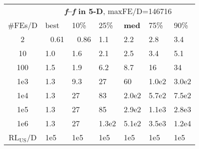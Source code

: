 \begin{tabular}{c|llllll}
 & \multicolumn{6}{|c}{\textbf{\textit{f}\raisebox{-0.35ex}{1}--\textit{f}\raisebox{-0.35ex}{24} in 5-D}, maxFE/D=146716}\\
\#FEs/D & best & 10\% & 25\% & \textbf{med} & 75\% & 90\%\\
2 & ~\,0.61 & ~\,0.86 & \hspace*{1ex}1.1 & \hspace*{1ex}2.2 & \hspace*{1ex}2.8 & \hspace*{1ex}3.4\\
10 & \hspace*{1ex}1.0 & \hspace*{1ex}1.6 & \hspace*{1ex}2.1 & \hspace*{1ex}2.5 & \hspace*{1ex}3.4 & \hspace*{1ex}5.1\\
100 & \hspace*{1ex}1.5 & \hspace*{1ex}1.9 & \hspace*{1ex}6.2 & \hspace*{1ex}8.7 & 16 & 34\\
1e3 & \hspace*{1ex}1.3 & \hspace*{1ex}9.3 & 27 & 60 & 1.0e2 & 3.0e2\\
1e4 & \hspace*{1ex}1.3 & 27 & 83 & 2.0e2 & 5.7e2 & 7.5e2\\
1e5 & \hspace*{1ex}1.3 & 27 & 85 & 2.9e2 & 1.1e3 & 2.8e3\\
1e6 & \hspace*{1ex}1.3 & 27 & 1.3e2 & 5.1e2 & 3.5e3 & 1.2e4\\
$\text{RL}_{\text{US}}$/D & 1e5 & 1e5 & 1e5 & 1e5 & 1e5 & 1e5
\end{tabular}
